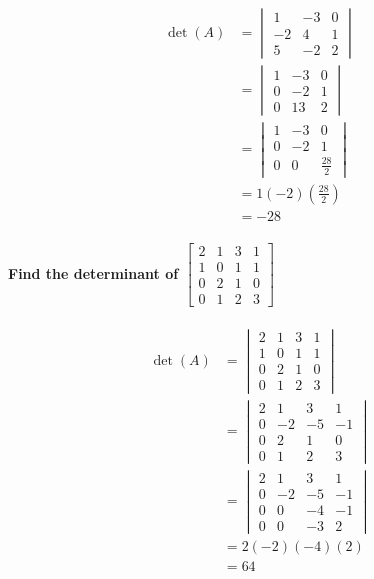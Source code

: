 \documentclass[
  letterpaper,
  DIV=11,
  numbers=noendperiod]{scrartcl}
\let\oldparagraph\paragraph
\renewcommand{\paragraph}[1]{\oldparagraph{#1}\mbox{}}
\begin{document}
\begin{align*}
\det(A) &= \begin{vmatrix}1 & -3 & 0 \\ -2 & 4 & 1 \\ 5 & -2 & 2 \end{vmatrix} \\
&= \begin{vmatrix}1 & -3 & 0 \\ 0 & -2 & 1 \\ 0 & 13 & 2 \end{vmatrix} \\
&= \begin{vmatrix}1 & -3 & 0 \\ 0 & -2 & 1 \\ 0 & 0 & \frac{28}{2} \end{vmatrix} \\
&= 1(-2)\left(\frac{28}{2}\right) \\
&= -28
\end{align*}

\newpage{}

\paragraph{\texorpdfstring{Find the determinant of
\(\begin{bmatrix} 2 & 1 & 3 & 1 \\ 1 & 0 & 1 & 1 \\ 0 & 2 & 1 & 0 \\ 0 & 1 & 2 & 3\end{bmatrix}\)}{Find the determinant of \textbackslash begin\{bmatrix\} 2 \& 1 \& 3 \& 1 \textbackslash\textbackslash{} 1 \& 0 \& 1 \& 1 \textbackslash\textbackslash{} 0 \& 2 \& 1 \& 0 \textbackslash\textbackslash{} 0 \& 1 \& 2 \& 3\textbackslash end\{bmatrix\}}}\label{find-the-determinant-of-beginbmatrix-2-1-3-1-1-0-1-1-0-2-1-0-0-1-2-3endbmatrix}

\begin{align*}
\det(A) &= \begin{vmatrix} 2 & 1 & 3 & 1 \\ 1 & 0 & 1 & 1 \\ 0 & 2 & 1 & 0 \\ 0 & 1 & 2 & 3\end{vmatrix} \\
&= \begin{vmatrix} 2 & 1 & 3 & 1 \\ 0 & -2 & -5 & -1 \\ 0 & 2 & 1 & 0 \\ 0 & 1 & 2 & 3\end{vmatrix} \\
&= \begin{vmatrix} 2 & 1 & 3 & 1 \\ 0 & -2 & -5 & -1 \\ 0 & 0 & -4 & -1 \\ 0 & 0 & -3 & 2\end{vmatrix} \\
&= 2(-2)(-4)(2) \\
&= 64
\end{align*}
\end{document}
